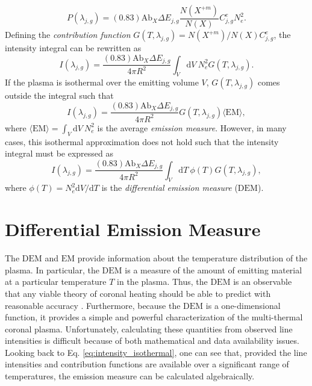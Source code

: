 \begin{equation}
	\label{eq:emissivity_simple}
	P(\lambda_{j,g})=(0.83)\mathrm{Ab}_X\Delta E_{j,g}\frac{N(X^{+m})}{N(X)}C^e_{j,g}N_e^2.
\end{equation}
Defining the \textit{contribution function} $G(T,\lambda_{j,g})=N(X^{+m})/N(X)C^e_{j,g}$, the intensity integral can be rewritten as
\begin{equation}
	I(\lambda_{j,g}) = \frac{(0.83)\mathrm{Ab}_X\Delta E_{j,g}}{4\pi R^2}\int_V\mathrm{d}V~N_e^2G(T,\lambda_{j,g}).
\end{equation}
If the plasma is isothermal over the emitting volume $V$, $G(T,\lambda_{j,g})$ comes outside the integral such that 
\begin{equation}
	\label{eq:intensity_isothermal}
	I(\lambda_{j,g}) = \frac{(0.83)\mathrm{Ab}_X\Delta E_{j,g}}{4\pi R^2}G(T,\lambda_{j,g})\langle\mathrm{EM}\rangle,
\end{equation}
where $\langle\mathrm{EM}\rangle=\int_V\mathrm{d}V~N_e^2$ is the average \textit{emission measure}. However, in many cases, this isothermal approximation does not hold such that the intensity integral must be expressed as 
\begin{equation}
	\label{eq:dem_integral}
	I(\lambda_{j,g}) = \frac{(0.83)\mathrm{Ab}_X\Delta E_{j,g}}{4\pi R^2}\int_V\mathrm{d}T~\phi(T)G(T,\lambda_{j,g}),
\end{equation}
where $\phi(T)=N_e^2\mathrm{d}V/\mathrm{d}T$ is the \textit{differential emission measure} ($\mathrm{DEM}$). 
\section{Differential Emission Measure}
\label{sec:dem}
%
\par The $\mathrm{DEM}$ and $\mathrm{EM}$ provide information about the temperature distribution of the plasma. In particular, the $\mathrm{DEM}$ is a measure of the amount of emitting material at a particular temperature $T$ in the plasma. Thus, the $\mathrm{DEM}$ is an observable that any viable theory of coronal heating should be able to predict with reasonable accuracy \citep{golub_solar_2010}. Furthermore, because the $\mathrm{DEM}$ is a one-dimensional function, it provides a simple and powerful characterization of the multi-thermal coronal plasma. Unfortunately, calculating these quantities from observed line intensities is difficult because of both mathematical and data availability issues. Looking back to Eq. \ref{eq:intensity_isothermal}, one can see that, provided the line intensities and contribution functions are available over a significant range of temperatures, the emission measure can be calculated algebraically.
%
